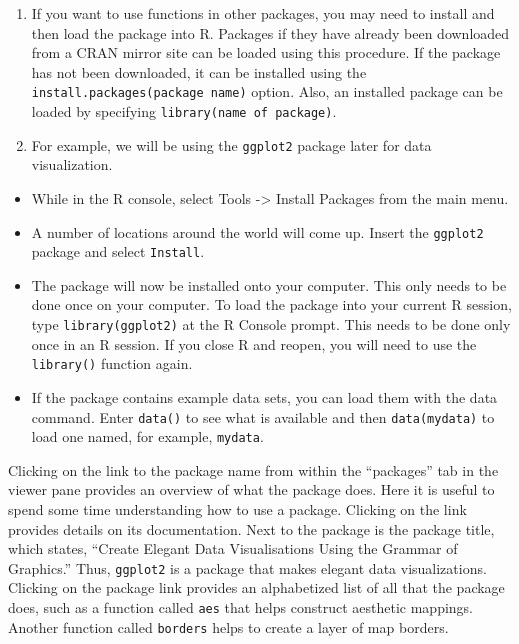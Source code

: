 \documentclass[]{book}
\providecommand{\tightlist}{%
  \setlength{\itemsep}{0pt}\setlength{\parskip}{0pt}}
\begin{document}
\begin{enumerate}
\def\labelenumi{\arabic{enumi}.}
\item
  If you want to use functions in other packages, you may need to
  install and then load the package into R. Packages if they have
  already been downloaded from a CRAN mirror site can be loaded using
  this procedure. If the package has not been downloaded, it can be
  installed using the \texttt{install.packages(package\ name)} option.
  Also, an installed package can be loaded by specifying
  \texttt{library(name\ of\ package)}.
\item
  For example, we will be using the \texttt{ggplot2} package later for
  data visualization.\\
\end{enumerate}

\begin{itemize}
\tightlist
\item
  While in the R console, select Tools -\textgreater{} Install Packages
  from the main menu.
\item
  A number of locations around the world will come up. Insert the
  \texttt{ggplot2} package and select \texttt{Install}.\\
\item
  The package will now be installed onto your computer. This only needs
  to be done once on your computer. To load the package into your
  current R session, type \texttt{library(ggplot2)} at the R Console
  prompt. This needs to be done only once in an R session. If you close
  R and reopen, you will need to use the \texttt{library()} function
  again.
\item
  If the package contains example data sets, you can load them with the
  data command. Enter \texttt{data()} to see what is available and then
  \texttt{data(mydata)} to load one named, for example, \texttt{mydata}.
\end{itemize}

Clicking on the link to the package name from within the ``packages''
tab in the viewer pane provides an overview of what the package does.
Here it is useful to spend some time understanding how to use a package.
Clicking on the link provides details on its documentation. Next to the
package is the package title, which states, ``Create Elegant Data
Visualisations Using the Grammar of Graphics.'' Thus, \texttt{ggplot2}
is a package that makes elegant data visualizations. Clicking on the
package link provides an alphabetized list of all that the package does,
such as a function called \texttt{aes} that helps construct aesthetic
mappings. Another function called \texttt{borders} helps to create a
layer of map borders.
\end{document}
